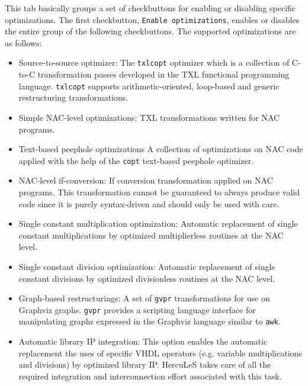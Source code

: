 \documentclass[a4paper]{article}
\begin{document}
This tab basically groups a set of checkbuttons for enabling or disabling specific optimizations. The first checkbutton, \texttt{Enable optimizations}, enables or disables the entire group of the following checkbuttons. The supported optimizations are as follows:
%
\begin{itemize}

\item Source-to-source optimizer:
The \texttt{txlcopt} optimizer which is a collection of C-to-C transformation passes developed in the TXL functional programming language. \texttt{txlcopt} supports arithmetic-oriented, loop-based and generic restructuring transformations.

\item Simple NAC-level optimizations:
TXL transformations written for NAC programs.

\item Text-based peephole optimizations
A collection of optimizations on NAC code applied with the help of the \texttt{copt} text-based peephole optimizer.

\item NAC-level if-conversion:
If conversion transformation applied on NAC programs. This transformation cannot be guaranteed to always produce valid code since it is purely syntax-driven and should only be used with care.

\item Single constant multiplication optimization:
Automatic replacement of single constant multiplications by optimized multiplierless routines at the NAC level.

\item Single constant division optimization:
Automatic replacement of single constant divisions by optimized divisionless routines at the NAC level.

\item Graph-based restructurings:
A set of \texttt{gvpr} transformations for use on Graphviz graphs. \texttt{gvpr} provides a scripting language interface for manipulating graphs expressed in the Graphviz language similar to \texttt{awk}.

\item Automatic library IP integration:
This option enables the automatic replacement the uses of specific VHDL operators (e.g. variable multiplications and divisions) by optimized library IP. HercuLeS takes care of all the required integration and interconnection effort associated with this task.

\end{itemize}
\end{document}
